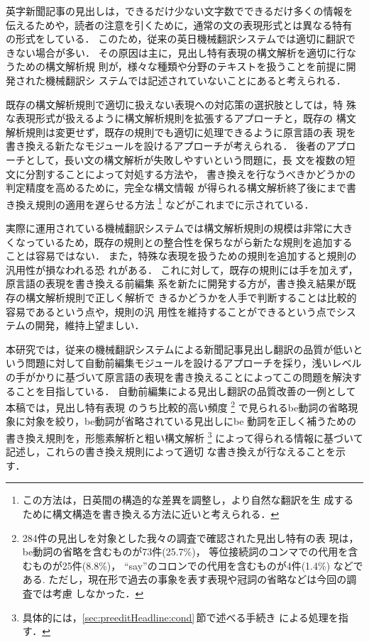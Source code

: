 英字新聞記事の見出しは，できるだけ少ない文字数でできるだけ多くの情報を
伝えるためや，読者の注意を引くために，通常の文の表現形式とは異なる特有
の形式をしている．
このため，従来の英日機械翻訳システムでは適切に翻訳できない場合が多い．
その原因は主に，見出し特有表現の構文解析を適切に行なうための構文解析規
則が，様々な種類や分野のテキストを扱うことを前提に開発された機械翻訳シ
ステムでは記述されていないことにあると考えられる．

既存の構文解析規則で適切に扱えない表現への対応策の選択肢としては，特
殊な表現形式が扱えるように構文解析規則を拡張するアプローチと，既存の
構文解析規則は変更せず，既存の規則でも適切に処理できるように原言語の表
現を書き換える新たなモジュールを設けるアプローチが考えられる．
後者のアプローチとして，長い文の構文解析が失敗しやすいという問題に，長
文を複数の短文に分割することによって対処する方法\cite{Kim94}や，
書き換えを行なうべきかどうかの判定精度を高めるために，完全な構文情報
が得られる構文解析終了後にまで書き換え規則の適用を遅らせる方法
\footnote{この方法は，日英間の構造的な差異を調整し，より自然な翻訳を生
成するために構文構造を書き換える方法\cite{Nagao85a}に近いと考えられる．}
\cite{Shirai95}
などがこれまでに示されている．

実際に運用されている機械翻訳システムでは構文解析規則の規模は非常に大き
くなっているため，既存の規則との整合性を保ちながら新たな規則を追加する
ことは容易ではない．
また，特殊な表現を扱うための規則を追加すると規則の汎用性が損なわれる恐
れがある．
これに対して，既存の規則には手を加えず，原言語の表現を書き換える前編集
系を新たに開発する方が，書き換え結果が既存の構文解析規則で正しく解析で
きるかどうかを人手で判断することは比較的容易であるという点や，規則の汎
用性を維持することができるという点でシステムの開発，維持上望ましい．

本研究では，従来の機械翻訳システムによる新聞記事見出し翻訳の品質が低いと
いう問題に対して自動前編集モジュールを設けるアプローチを採り，浅いレベル
の手がかりに基づいて原言語の表現を書き換えることによってこの問題を解決す
ることを目指している．
自動前編集による見出し翻訳の品質改善の一例として本稿では，見出し特有表現
のうち比較的高い頻度
\footnote{284件の見出しを対象とした我々の調査で確認された見出し特有の表
現\cite{Uenoda78}は，
be動詞の省略を含むものが73件(25.7\%)，
等位接続詞のコンマでの代用を含むものが25件(8.8\%)，
``say''のコロンでの代用を含むものが4件(1.4\%)
などである.
ただし，現在形で過去の事象を表す表現や冠詞の省略などは今回の調査では考慮
しなかった．}
で見られるbe動詞の省略現象に対象を絞り，be動詞が省略されている見出しにbe
動詞を正しく補うための書き換え規則を，形態素解析と粗い構文解析
\footnote{具体的には，\ref{sec:preeditHeadline:cond}\,節で述べる手続き
による処理を指す．}
によって得られる情報に基づいて記述し，これらの書き換え規則によって適切
な書き換えが行なえることを示す．

